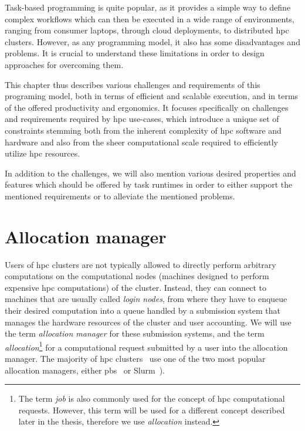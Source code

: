 Task-based programming is quite popular, as it provides a simple way to define complex workflows
which can then be executed in a wide range of environments, ranging from consumer laptops, through
cloud deployments, to distributed \gls{hpc} clusters. However, as any programming
model, it also has some disadvantages and problems. It is crucial to understand these limitations
in order to design approaches for overcoming them.

This chapter thus describes various challenges and requirements of this programing model, both in
terms of efficient and scalable execution, and in terms of the offered productivity and ergonomics.
It focuses specifically on challenges and requirements required by \gls{hpc}
use-cases, which introduce a unique set of constraints stemming both from the inherent complexity
of \gls{hpc} software and hardware and also from the sheer computational scale
required to efficiently utilize \gls{hpc} resources.

In addition to the challenges, we will also mention various desired properties and features which
should be offered by task runtimes in order to either support the mentioned requirements or to
alleviate the mentioned problems.

\section{Allocation manager}
Users of \gls{hpc} clusters are not typically allowed to directly perform
arbitrary computations on the computational nodes (machines designed to perform expensive
\gls{hpc} computations) of the cluster. Instead, they can connect to machines that
are usually called \emph{login nodes}, from where they have to enqueue their desired
computation into a queue handled by a submission system that manages the hardware resources of the
cluster and user accounting. We will use the term \emph{allocation manager} for these submission
systems, and the term \emph{allocation}\footnote{The term \emph{job} is also commonly used for the concept of
\gls{hpc} computational requests. However, this term will be used for a different concept described later in the thesis, therefore we use \emph{allocation} instead.} for a computational
request submitted by a user into the allocation manager. The majority of \gls{hpc}
clusters~\cite{slurm-schedmd} use one of the two most popular allocation managers, either
\gls{pbs}~\cite{pbs} or Slurm~\cite{slurm}).

